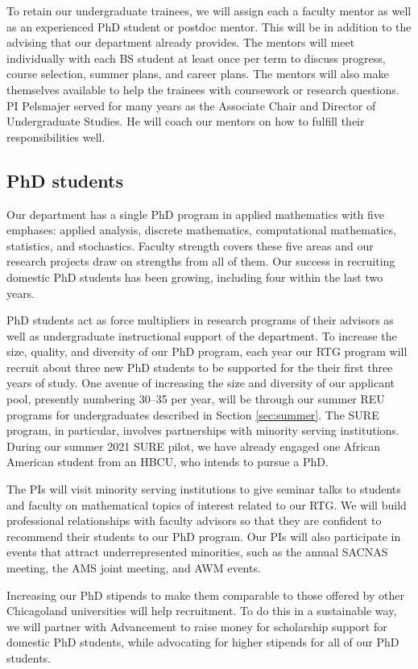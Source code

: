 \documentclass[11pt]{NSFamsart}
\begin{document}
To retain our undergraduate trainees, we will assign each a faculty mentor as well as an experienced PhD student or postdoc mentor.  This will be in addition to the advising that our department already provides.  The mentors will meet individually with each BS student at least once per term to discuss progress, course selection, summer plans, and career plans.  The mentors will also make themselves available to help the trainees with coursework or research questions.  PI Pelsmajer served for many years as the Associate Chair and Director of Undergraduate Studies. He will coach our mentors on how to fulfill their responsibilities well.

\subsection*{PhD students} 
Our department has a single PhD program in applied mathematics with five emphases: applied analysis, discrete mathematics, computational mathematics, statistics, and stochastics.  Faculty strength covers these five areas and our research projects draw on strengths from all of them. Our success in recruiting domestic PhD students has been growing, including four within the last two years.

PhD students act as force multipliers in research programs of their advisors as well as undergraduate instructional support of the department. To increase the size, quality, and diversity of our PhD program, each year our RTG program will recruit about three new PhD students to be supported for the their first three years of study.  One avenue of increasing the size and diversity of our applicant pool, presently numbering 30--35 per year, will be through our summer REU programs for undergraduates described in Section \ref{sec:summer}.  The SURE program, in particular, involves partnerships with minority serving institutions.  During our summer 2021 SURE pilot, we have already engaged one African American student from an HBCU, who intends to pursue a PhD.  

The PIs will visit minority serving institutions to give seminar talks to students and faculty on mathematical topics of interest related to our RTG.  We will build professional relationships with faculty advisors so that they are confident to recommend their students to our PhD program.  Our PIs will also participate in events that attract underrepresented minorities, such as the annual SACNAS meeting, the AMS joint meeting, and AWM events.

Increasing our PhD stipends to make them comparable to those offered by other Chicagoland universities will help recruitment. To do this in a sustainable way, we will partner with Advancement to raise money for scholarship support for domestic PhD students, while advocating for higher stipends for all of our PhD students.
\end{document}
